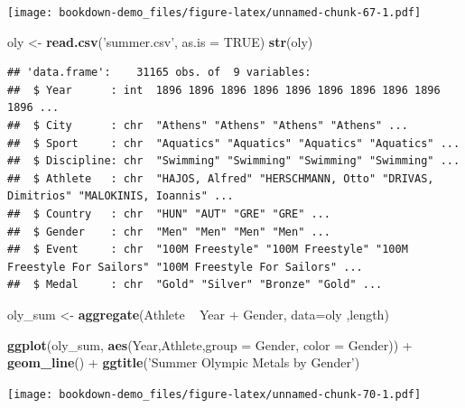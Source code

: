 \documentclass[]{book}
\newenvironment{Shaded}{\begin{snugshade}}{\end{snugshade}}
\newcommand{\KeywordTok}[1]{\textcolor[rgb]{0.13,0.29,0.53}{\textbf{{#1}}}}
\newcommand{\DataTypeTok}[1]{\textcolor[rgb]{0.13,0.29,0.53}{{#1}}}
\newcommand{\StringTok}[1]{\textcolor[rgb]{0.31,0.60,0.02}{{#1}}}
\newcommand{\OtherTok}[1]{\textcolor[rgb]{0.56,0.35,0.01}{{#1}}}
\newcommand{\NormalTok}[1]{{#1}}
\begin{document}
\texttt{[image: bookdown-demo\_files/figure-latex/unnamed-chunk-67-1.pdf]}

\begin{Shaded}
\begin{Highlighting}[]
\NormalTok{oly <-}\StringTok{ }\KeywordTok{read.csv}\NormalTok{(}\StringTok{'summer.csv'}\NormalTok{, }\DataTypeTok{as.is =} \OtherTok{TRUE}\NormalTok{)}
\KeywordTok{str}\NormalTok{(oly)}
\end{Highlighting}
\end{Shaded}

\begin{verbatim}
## 'data.frame':    31165 obs. of  9 variables:
##  $ Year      : int  1896 1896 1896 1896 1896 1896 1896 1896 1896 1896 ...
##  $ City      : chr  "Athens" "Athens" "Athens" "Athens" ...
##  $ Sport     : chr  "Aquatics" "Aquatics" "Aquatics" "Aquatics" ...
##  $ Discipline: chr  "Swimming" "Swimming" "Swimming" "Swimming" ...
##  $ Athlete   : chr  "HAJOS, Alfred" "HERSCHMANN, Otto" "DRIVAS, Dimitrios" "MALOKINIS, Ioannis" ...
##  $ Country   : chr  "HUN" "AUT" "GRE" "GRE" ...
##  $ Gender    : chr  "Men" "Men" "Men" "Men" ...
##  $ Event     : chr  "100M Freestyle" "100M Freestyle" "100M Freestyle For Sailors" "100M Freestyle For Sailors" ...
##  $ Medal     : chr  "Gold" "Silver" "Bronze" "Gold" ...
\end{verbatim}

\begin{Shaded}
\begin{Highlighting}[]
\NormalTok{oly_sum <-}\StringTok{ }\KeywordTok{aggregate}\NormalTok{(Athlete ~}\StringTok{ }\NormalTok{Year +}\StringTok{ }\NormalTok{Gender, }\DataTypeTok{data=}\NormalTok{oly ,length)}
\end{Highlighting}
\end{Shaded}

\begin{Shaded}
\begin{Highlighting}[]
\KeywordTok{ggplot}\NormalTok{(oly_sum, }\KeywordTok{aes}\NormalTok{(Year,Athlete,}\DataTypeTok{group =} \NormalTok{Gender, }\DataTypeTok{color =} \NormalTok{Gender)) +}\StringTok{ }\KeywordTok{geom_line}\NormalTok{() +}\StringTok{ }\KeywordTok{ggtitle}\NormalTok{(}\StringTok{'Summer Olympic Metals by Gender'}\NormalTok{)}
\end{Highlighting}
\end{Shaded}

\texttt{[image: bookdown-demo\_files/figure-latex/unnamed-chunk-70-1.pdf]}
\end{document}
